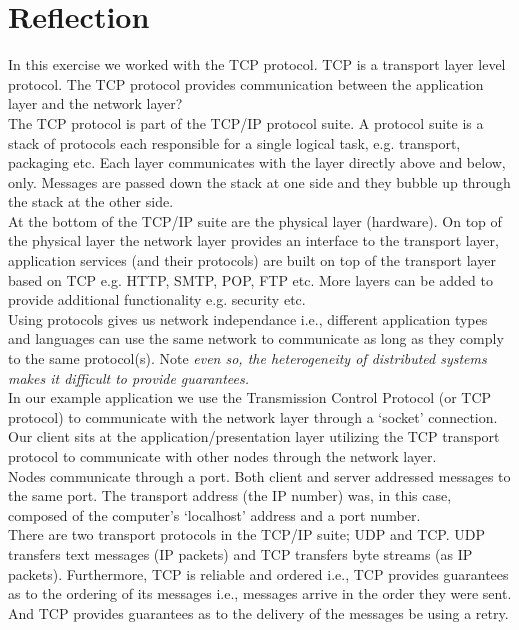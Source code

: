 \section{Reflection}
\label{tcp_reflection}

In this exercise we worked with the TCP protocol. TCP is a transport layer level protocol. The TCP protocol provides communication between the application layer and the network layer?\\

The TCP protocol is part of the TCP/IP protocol suite. A protocol suite is a stack of protocols each responsible for a single logical task, e.g. transport, packaging etc. Each layer communicates with the layer directly above and below, only. Messages are passed down the stack at one side and they bubble up through the stack at the other side. \\

At the bottom of the TCP/IP suite are the physical layer (hardware). On top of the physical layer the network layer provides an interface to the transport layer, application services (and their protocols) are built on top of the transport layer based on TCP e.g. HTTP, SMTP, POP, FTP etc. More layers can be added to provide additional functionality e.g. security etc.\\

Using protocols gives us network independance i.e., different application types and languages can use the same network to communicate 
as long as they comply to the same protocol(s). Note \textit{even so, the heterogeneity of distributed systems makes it difficult to provide guarantees.}\\

In our example application we use the Transmission Control Protocol (or TCP protocol) to communicate with the network layer through a ‘socket’ connection. Our client sits at the application/presentation layer utilizing the TCP transport protocol to communicate with other nodes through the network layer.\\

Nodes communicate through a port. Both client and server addressed messages to the same port. The transport address (the IP number) was, in this case, composed of the computer's  ‘localhost’ address and a port number. \\

There are two transport protocols in the TCP/IP suite; UDP and TCP. UDP transfers text messages (IP packets) and TCP transfers byte streams (as IP packets). Furthermore, TCP is reliable and ordered i.e., TCP provides guarantees as to the ordering of its messages i.e., messages arrive in the order they were sent. And TCP provides guarantees as to the delivery of the messages be using a retry.  \\

